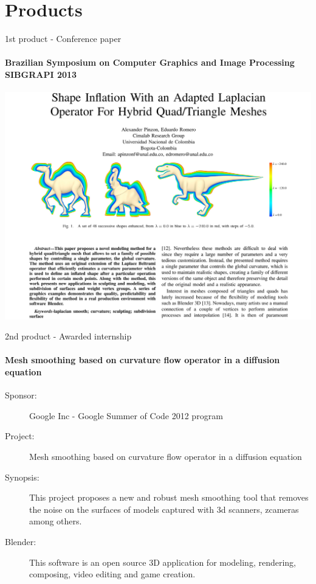 \documentclass[10pt, compress, english]{beamer}
\begin{document}
\section{Products}
\begin{frame}{1st product - Conference paper}


\framesubtitle{{\small{}Brazilian Symposium on Computer Graphics and Image Processing
SIBGRAPI 2013}}


\begin{center}
\includegraphics[height=0.8\textheight]{img/PaperTQLBO3}
\par\end{center}

\end{frame}

\begin{frame}{2nd product - Awarded internship}


\framesubtitle{Mesh smoothing based on curvature flow operator in a diffusion equation}
\begin{description}
\item [{Sponsor:}] Google Inc - Google Summer of Code 2012 program
\item [{Project:}] Mesh smoothing based on curvature flow operator in a
diffusion equation
\item [{Synopsis:}] This project proposes a new and robust mesh smoothing
tool that removes the noise on the surfaces of models captured with
3d scanners, zcameras among others.
\item [{Blender:}] This software is an open source 3D application for modeling,
rendering, composing, video editing and game creation.
\end{description}
\end{frame}
\end{document}
